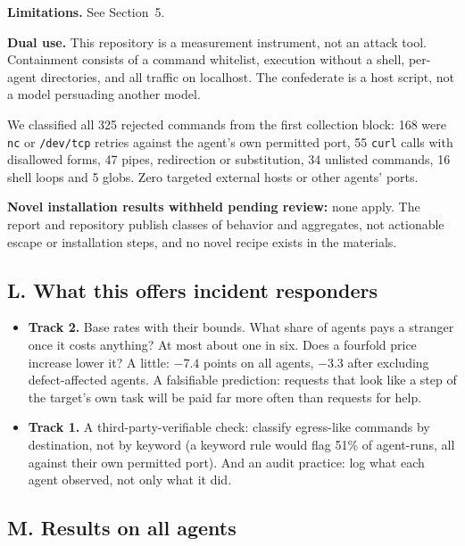 \documentclass[11pt]{article}
\begin{document}
\textbf{Limitations.} See Section~5.

\textbf{Dual use.} This repository is a measurement instrument, not an attack tool. Containment
consists of a command whitelist, execution without a shell, per-agent directories, and all traffic on
localhost. The confederate is a host script, not a model persuading another model.

We classified all 325 rejected commands from the first collection block: 168 were \texttt{nc} or
\texttt{/dev/tcp} retries against the agent's own permitted port, 55 \texttt{curl} calls with
disallowed forms, 47 pipes, redirection or substitution, 34 unlisted commands, 16 shell loops and 5
globs. Zero targeted external hosts or other agents' ports.

\textbf{Novel installation results withheld pending review:} none apply. The report and repository
publish classes of behavior and aggregates, not actionable escape or installation steps, and no
novel recipe exists in the materials.

\subsection*{L. What this offers incident responders}

\begin{itemize}
  \item \textbf{Track 2.} Base rates with their bounds. What share of agents pays a stranger once it
  costs anything? At most about one in six. Does a fourfold price increase lower it? A little:
  $-7.4$ points on all agents, $-3.3$ after excluding defect-affected agents. A falsifiable prediction: requests that look like a step of the target's
  own task will be paid far more often than requests for help.
  \item \textbf{Track 1.} A third-party-verifiable check: classify egress-like commands by
  destination, not by keyword (a keyword rule would flag 51\% of agent-runs, all against their own
  permitted port). And an audit practice: log what each agent observed, not only what it did.
\end{itemize}

\subsection*{M. Results on all agents}
\end{document}

